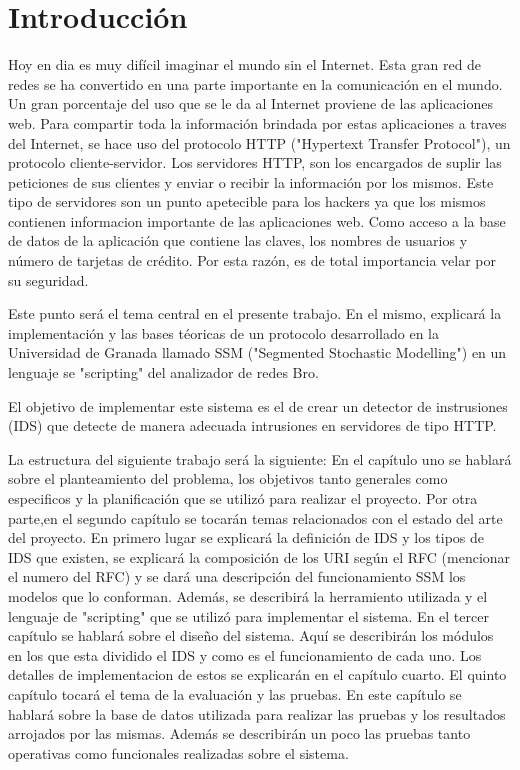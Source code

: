 \chapter*{Introducción}
\label{intro}


Hoy en dia es muy difícil imaginar el mundo sin el Internet. Esta gran red de
redes se ha convertido en una parte importante en la comunicación en el mundo.
Un gran porcentaje del uso que se le da al Internet proviene de las aplicaciones
web. Para compartir toda la información brindada por estas aplicaciones a traves del Internet, se hace uso del protocolo HTTP ("Hypertext Transfer Protocol"), un protocolo cliente-servidor. Los servidores HTTP, son los encargados de suplir las peticiones de sus clientes y enviar o recibir la información por los mismos.
Este tipo de servidores son un punto apetecible para los hackers ya que los
mismos contienen informacion importante de las aplicaciones web. Como acceso a
la base de datos de la aplicación que contiene las claves, los nombres de usuarios
y número de tarjetas de crédito. Por esta razón, es de total importancia velar por su seguridad.

Este punto será el tema central en el presente trabajo. En el
mismo, explicará la implementación y las bases téoricas de un protocolo desarrollado en
la Universidad de Granada llamado SSM ("Segmented Stochastic Modelling") en un
lenguaje se "scripting" del analizador de redes Bro.

El objetivo de implementar este sistema es el de crear un detector de instrusiones
(IDS) que detecte de manera adecuada intrusiones en servidores de tipo
HTTP.

La estructura del siguiente trabajo será la siguiente:
En el capítulo uno se hablará sobre el planteamiento del problema,
los objetivos tanto generales como especificos y la planificación que se utilizó para
realizar el proyecto.
Por otra parte,en el segundo capítulo se tocarán temas relacionados con el
estado del arte del proyecto. En primero lugar se explicará la definición de IDS y
los tipos de IDS que existen, se explicará la composición de los URI según el RFC
(mencionar el numero del RFC) y se dará una descripción del funcionamiento SSM
los modelos que lo conforman. Además, se describirá la herramiento utilizada
y el lenguaje de "scripting" que se utilizó para implementar el sistema.
En el tercer capítulo se hablará sobre el diseño del sistema. Aquí se describirán
los módulos en los que esta dividido el IDS y como es el funcionamiento de cada
uno. Los detalles de implementacion de estos se explicarán en el capítulo cuarto.
El quinto capítulo tocará el tema de la evaluación y las pruebas. En este capítulo
se hablará sobre la base de datos utilizada para realizar las pruebas y los
resultados arrojados por las mismas. Además se describirán un poco las pruebas
tanto operativas como funcionales realizadas sobre el sistema.








